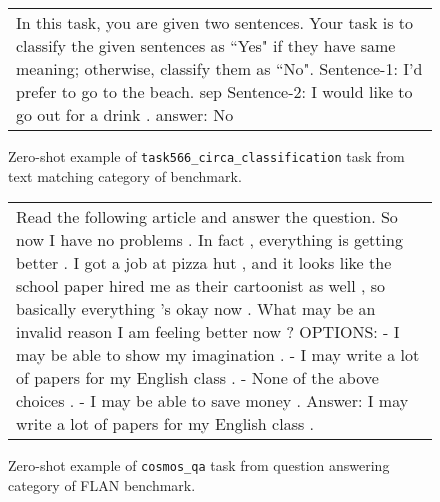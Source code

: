 \begin{figure}[h]
\centering
\begin{tabular}{p{}}
\cellcolor{oldlace} In this task, you are given two sentences. Your task is to classify the given sentences as ``Yes" if they have same meaning; otherwise, classify them as ``No". \vspace{1pt} \newline Sentence-1: I'd prefer to go to the beach. sep Sentence-2: I would like to go out for a drink .\vspace{1pt} \newline answer: \textcolor{cadmiumgreen}{No} \\
\end{tabular}
\caption{Zero-shot example of \texttt{task566\_circa\_classification} task from text matching category of \natins benchmark.}
\end{figure}




\begin{figure}[h]
\centering
\begin{tabular}{p{}}
\cellcolor{oldlace} Read the following article and answer the question.\vspace{1pt} \newline \vspace{1pt} \newline So now I have no problems . In fact , everything is getting better . I got a job at pizza hut , and it looks like the school paper hired me as their cartoonist as well , so basically everything 's okay now .\vspace{1pt} \newline \vspace{1pt} \newline What may be an invalid reason I am feeling better now ?\vspace{1pt} \newline OPTIONS:\vspace{1pt} \newline - I may be able to show my imagination .\vspace{1pt} \newline - I may write a lot of papers for my English class .\vspace{1pt} \newline - None of the above choices .\vspace{1pt} \newline - I may be able to save money . Answer: \textcolor{cadmiumgreen}{I may write a lot of papers for my English class .} \\
\end{tabular}
\caption{Zero-shot example of \texttt{cosmos\_qa} task from question answering category of FLAN benchmark.}
\end{figure}




